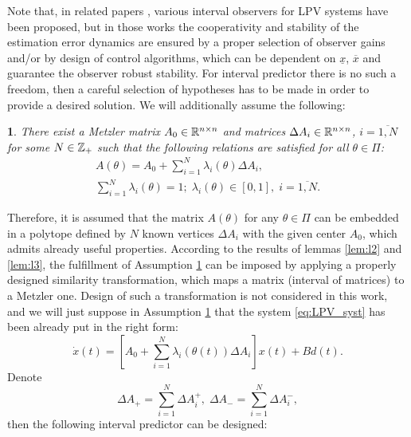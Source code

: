 \documentclass[letterpaper, 10 pt, conference]{ieeeconf}
\theoremstyle{plain}
\theoremstyle{definition}
\theoremstyle{plain}
\newtheorem{assumption}{\protect\assumptionname}
\theoremstyle{plain}
\theoremstyle{remark}
\providecommand{\assumptionname}{Assumption}
\begin{document}
Note that, in related papers \cite{AitRami2008,RVZ10,Bolajraf2011,Efimov_a2013,Efimov_tac2013,Chebotarev2015}, various interval observers for LPV systems have been proposed, but in those works the cooperativity and stability of the estimation error dynamics are ensured by a proper selection of observer gains and/or by design of control algorithms, which can be dependent on $\underline{x}$, $\overline{x}$ and guarantee the observer robust stability. For interval predictor there is no such a freedom, then a careful selection of hypotheses has to be made in order to provide a desired solution.
We will additionally assume the following:
\begin{assumption}
\label{ass:a3} There exist a Metzler matrix $A_{0}\in\mathbb{R}^{n\times n}$ and matrices $\Delta A_{i}\in\mathbb{R}^{n\times n}$, $i=\overline{1,N}$ for some $N\in\mathbb{Z}_{+}$ such that the following relations are satisfied for all $\theta\in\Pi$:
\begin{gather*}
A(\theta)=A_{0}+\sum_{i=1}^{N}\lambda_{i}(\theta)\Delta A_{i},\\
\sum_{i=1}^{N}\lambda_{i}(\theta)=1;\;\lambda_{i}(\theta)\in[0,1],\;i=\overline{1,N}.
\end{gather*}
\end{assumption}
Therefore, it is assumed that the matrix $A(\theta)$ for any $\theta\in\Pi$ can be embedded in a polytope defined by $N$ known vertices $\Delta A_{i}$ with the given center $A_{0}$, which admits already useful properties. According to the results of lemmas \ref{lem:l2} and \ref{lem:l3}, the fulfillment of Assumption \ref{ass:a3} can be imposed by applying a properly designed similarity transformation, which maps a matrix (interval of matrices) to a Metzler one. Design of such a transformation is not considered in this work, and we will just suppose in Assumption \ref{ass:a3} that the system \eqref{eq:LPV_syst} has been already put in the right form:
\[
\dot{x}(t)=[A_{0}+\sum_{i=1}^{N}\lambda_{i}(\theta(t))\Delta A_{i}]x(t)+Bd(t).
\]
Denote
\[
\Delta A_{+}=\sum_{i=1}^{N}\Delta A_{i}^{+},\;\Delta A_{-}=\sum_{i=1}^{N}\Delta A_{i}^{-},
\]
then the following interval predictor can be designed:
\end{document}
